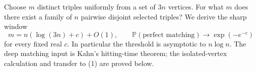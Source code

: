 Choose $m$ distinct triples uniformly from a set of $3n$ vertices. For what $m$ does there exist a family of $n$ pairwise disjoint selected triples? We derive the sharp window
\[
 m=n(\log(3n)+c)+O(1),\qquad
 \mathbb P(\text{perfect matching})\longrightarrow\exp(-e^{-c}) \tag{1}
\]
for every fixed real $c$. In particular the threshold is asymptotic to $n\log n$. The deep matching input is Kahn's hitting-time theorem; the isolated-vertex calculation and transfer to (1) are proved below.
